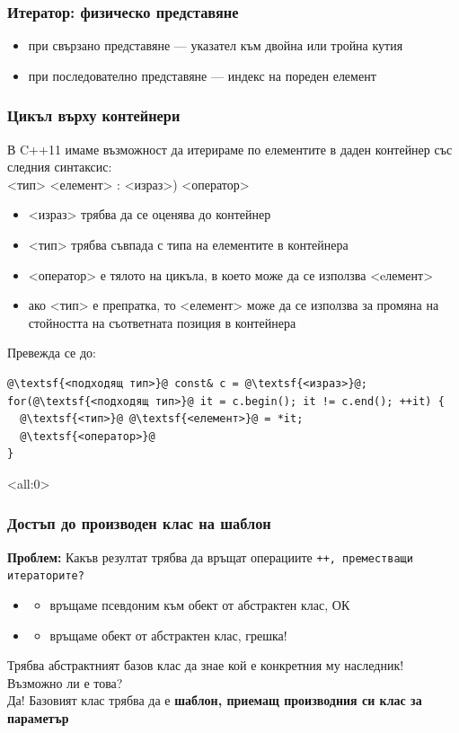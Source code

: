 \documentclass[alsotrans]{beamerswitch}
\def\crtp{all:0}
\begin{document}
\begin{frame}
  \frametitle{Итератор: физическо представяне}

  \begin{itemize}
  \item при свързано представяне --- указател към двойна или тройна кутия
  \item при последователно представяне --- индекс на пореден елемент
  \end{itemize}
\end{frame}

\begin{frame}[fragile]
  \frametitle{Цикъл върху контейнери}
  В C++11 имаме възможност да итерираме по елементите в даден контейнер със следния синтаксис:\\
  <тип> <елемент> \tta: <израз>\tta) <оператор>
  \pause
  \begin{itemize}[<+->]
  \item{} <израз> трябва да се оценява до контейнер
  \item{} <тип> трябва съвпада с типа на елементите в контейнера
  \item{} <оператор> е тялото на цикъла, в което може да се използва <eлемент>
  \item ако <тип> е препратка, то <елемент> може да се използва за промяна на стойността на съответната позиция в контейнера
  \end{itemize}
  \onslide<+->
  Превежда се до:
\begin{lstlisting}
@\textsf{<подходящ тип>}@ const& c = @\textsf{<израз>}@;
for(@\textsf{<подходящ тип>}@ it = c.begin(); it != c.end(); ++it) {
  @\textsf{<тип>}@ @\textsf{<елемент>}@ = *it;
  @\textsf{<оператор>}@
}
\end{lstlisting}
\end{frame}

\begin{frame}<\crtp>
  \frametitle{Достъп до производен клас на шаблон}

  \textbf{Проблем:} Какъв резултат трябва да връщат операциите \tt{++}, преместващи итераторите?\\[2ex]
  \begin{itemize}
  \item {}
    \begin{itemize}
    \item връщаме псевдоним към обект от абстрактен клас, ОК
    \end{itemize}
  \item{}
    \begin{itemize}
    \item връщаме обект от абстрактен клас, \alert{грешка!}
    \end{itemize}
  \end{itemize}
  \vspace{2ex}
  \pause
  Трябва абстрактният базов клас да знае кой е конкретния му наследник! Възможно ли е това?\\[2ex]
  \pause
  \alert{Да! Базовият клас трябва да е \textbf{шаблон, приемащ производния си клас за параметър}}
\end{frame}
\end{document}

